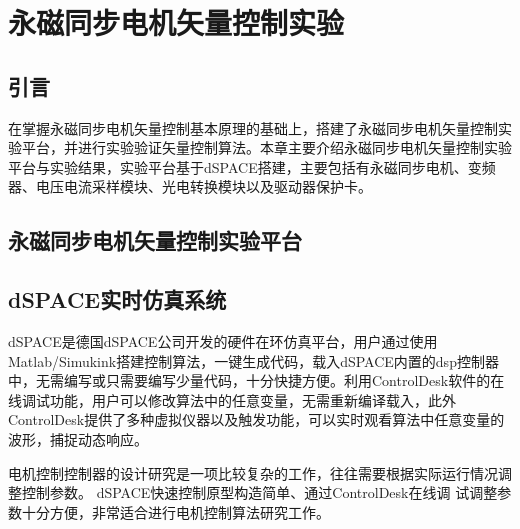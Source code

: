 \chapter{永磁同步电机矢量控制实验}
\section{引言}
在掌握永磁同步电机矢量控制基本原理的基础上，搭建了永磁同步电机矢量控制实验平台，并进行实验验证矢量控制算法。本章主要介绍永磁同步电机矢量控制实验平台与实验结果，实验平台基于dSPACE搭建，主要包括有永磁同步电机、变频器、电压电流采样模块、光电转换模块以及驱动器保护卡。
\section{永磁同步电机矢量控制实验平台}

\section{dSPACE实时仿真系统}
dSPACE是德国dSPACE公司开发的硬件在环仿真平台，用户通过使用Matlab/Simukink搭建控制算法，一键生成代码，载入dSPACE内置的dsp控制器中，无需编写或只需要编写少量代码，十分快捷方便。利用ControlDesk软件的在线调试功能，用户可以修改算法中的任意变量，无需重新编译载入，此外ControlDesk提供了多种虚拟仪器以及触发功能，可以实时观看算法中任意变量的波形，捕捉动态响应。

电机控制控制器的设计研究是一项比较复杂的工作，往往需要根据实际运行情况调整控制参数。 dSPACE快速控制原型构造简单、通过ControlDesk在线调
试调整参数十分方便，非常适合进行电机控制算法研究工作\cite{_dspacesvpwm_2015,_dspace_2011}。
